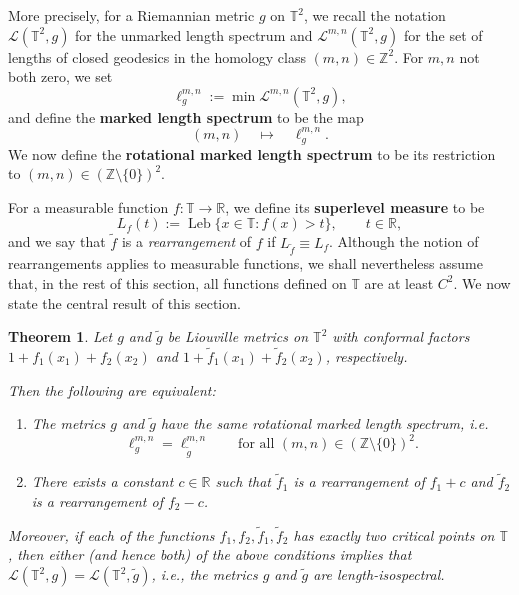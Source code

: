 \documentclass[11pt,letterpaper,oneside]{amsart}
\newcommand{\Z}{\mathbb{Z}}
\newcommand{\R}{\mathbb{R}}
\newcommand{\T}{\mathbb{T}}
\newtheorem{theo}{Theorem}[section]
\theoremstyle{definition}
\theoremstyle{remark}
\newcommand{\wt}{\widetilde}
\theoremstyle{definition}
\theoremstyle{remark}
\newcommand{\CL}{\mathcal{L}}
\DeclareMathOperator{\leb}{Leb}
\begin{document}
\medskip

More precisely, for a Riemannian metric $g$ on $\T^2$, we recall the notation $\CL(\T^2,g)$ for the unmarked length spectrum and $\CL^{m,n}(\T^2,g)$ for the set of lengths of closed geodesics in the homology class $(m,n) \in \Z^2$.
For $m,n$ not both zero, we set 
\[
    \ell^{m,n}_g := \min \CL^{m,n}(\T^2,g),
\]
and define the \textbf{marked length spectrum} to be the map
\[
(m,n)\quad \longmapsto \quad  \ell^{m,n}_g.
\]
We now define the \textbf{rotational marked length spectrum} to be its restriction to
$(m,n)\in(\Z \setminus \{0\})^2$.

\medskip

For a measurable function $f:\T\to\R$, we define its \textbf{superlevel measure} to be
\begin{equation}\label{eq:superlevel-measure}
    L_f(t) := \leb\{x\in\T : f(x)>t\}, \qquad t\in\R,
\end{equation}
and we say that $\tilde f$ is a \emph{rearrangement} of $f$ if
$L_{\tilde f} \equiv L_f$. 
Although the notion of rearrangements applies to measurable functions, we shall nevertheless assume that, in the rest of this section, all functions defined on $\T$ are at least $C^2$.
We now state the central result of this section. 

\begin{theo}\label{thm:rearrangement-rotMLS}
Let $g$ and $\wt g$ be Liouville metrics on $\T^2$ with conformal factors $1+f_1(x_1)+f_2(x_2)$ and $1+\wt f_1(x_1)+\wt f_2(x_2)$, respectively.

Then the following are equivalent:
\begin{enumerate}
  \item The metrics $g$ and $\wt g$ have the same rotational marked length
        spectrum, i.e.
        \[
        \ell^{m,n}_g = \ell^{m,n}_{\wt g} \qquad
        \text{for all } (m,n)\in (\Z \setminus \{0\})^2.
        \]
  \item There exists a constant $c\in\R$ such that
        $\wt f_1$ is a rearrangement of $f_1+c$ and $\wt f_2$ is a
        rearrangement of $f_2-c$.
\end{enumerate}

Moreover, if each of the functions $f_1,f_2,\wt f_1,\wt f_2$ has exactly two
critical points on $\T$, then either (and hence both) of the above conditions
 implies that $\CL(\T^2,g) = \CL(\T^2,\wt g)$, i.e., the metrics $g$ and $\wt g$ are length-isospectral.
\end{theo}
\end{document}
